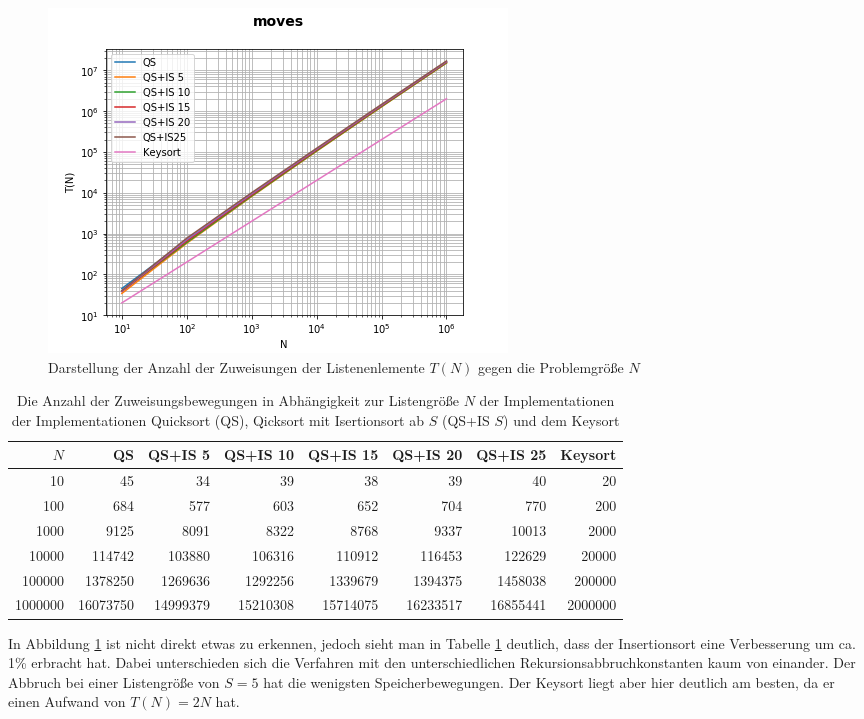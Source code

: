 \documentclass[
   draft=false
  ,paper=a4
  ,twoside=false
  ,fontsize=11pt
  ,headsepline
  ,DIV=11
  ,parskip=full+
  ,titlepage
]{scrartcl} %
\begin{document}
\begin{figure}[htp]
  \centering
  \includegraphics[width=\textwidth]{../moves.png}
  \caption[Bewegungen]{Darstellung der Anzahl der Zuweisungen der Listenenlemente $T(N)$ gegen die Problemgröße $N$}
  \label{fig:moves}
\end{figure}


\begin{table}[htp]
  \centering
  \caption[Bewegungen]{Die Anzahl der Zuweisungsbewegungen in Abhängigkeit 
  zur Listengröße $N$ der Implementationen  der Implementationen Quicksort (QS),
  Qicksort mit Isertionsort ab $S$ (QS+IS $S$) und dem Keysort}
  \label{tab:moves}
  \begin{tabular}{|r|r|r|r|r|r|r|r|}
  \hline
  $N$ & QS & QS+IS 5 & QS+IS 10 & QS+IS 15 & QS+IS 20 & QS+IS 25 & Keysort \\
  \hline
  10 & 45 & 34 & 39 & 38 & 39 & 40 & 20 \\
100 & 684 & 577 & 603 & 652 & 704 & 770 & 200 \\
1000 & 9125 & 8091 & 8322 & 8768 & 9337 & 10013 & 2000 \\
10000 & 114742 & 103880 & 106316 & 110912 & 116453 & 122629 & 20000 \\
100000 & 1378250 & 1269636 & 1292256 & 1339679 & 1394375 & 1458038 & 200000 \\
1000000 & 16073750 & 14999379 & 15210308 & 15714075 & 16233517 & 16855441 & 2000000 \\
  \hline
  \end{tabular}
\end{table}

In Abbildung \ref{fig:moves} ist nicht direkt etwas zu erkennen, jedoch sieht
man in Tabelle \ref{tab:moves} deutlich, dass der Insertionsort eine Verbesserung um ca. 1\% erbracht hat. Dabei unterschieden sich die Verfahren mit den unterschiedlichen Rekursionsabbruchkonstanten kaum von einander.   Der Abbruch bei einer Listengröße von $S=5$ hat die wenigsten Speicherbewegungen. Der Keysort liegt aber hier deutlich am besten, da er einen Aufwand von $T(N) = 2N$ hat. 
\end{document}
